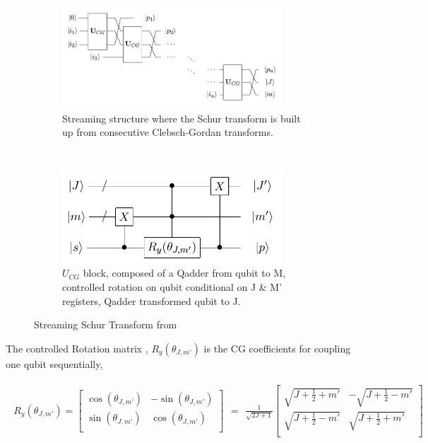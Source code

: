 \documentclass[12pt]{article}
\begin{document}
\begin{figure}[H]
\centering
\begin{subfigure}[H]{0.49\textwidth}
\centering
\includegraphics[width=0.9\textwidth]{schurcascade.png}
\caption{Streaming structure where the Schur transform is built up from consecutive Clebsch-Gordan transforms.}
\label{fig:stream}
\end{subfigure}
~
\begin{subfigure}[H]{0.49\textwidth}
\centering
\includegraphics[width=0.9\textwidth]{genaddercirc.png}
\caption{$U_{CG}$ block, composed of a Qadder from qubit to M, controlled rotation on qubit conditional on J \& M' registers, Qadder transformed qubit to J.}
\label{fig:ucg}
\end{subfigure}
\caption{Streaming Schur Transform from \cite{bacon2006efficient}}  
\end{figure}

The controlled Rotation matrix \cite{bacon2006efficient}, $R_y(\theta_{J,m'})$ is the CG coefficients for coupling one qubit sequentially,

\begin{align}
\begin{split}
R_y(\theta_{J,m'})=
\begin{bmatrix}
\cos(\theta_{J,m'}) &-\sin(\theta_{J,m'}) \\
\sin(\theta_{J,m'}) & \cos(\theta_{J,m'}) \\
\end{bmatrix}
\end{split}
=
\begin{split}
\frac{1}{\sqrt{2J+1}}
\begin{bmatrix}
\sqrt{J+\frac{1}{2}+m'} &-\sqrt{J+\frac{1}{2}-m'} \\
\sqrt{J+\frac{1}{2}-m'} & \sqrt{J+\frac{1}{2}+m'} \\
\end{bmatrix}
\end{split}
\label{eq:rotmatrix}
\end{align}
\end{document}
